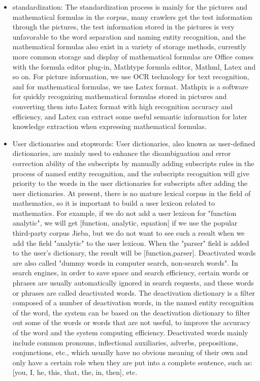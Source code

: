 \documentclass[11pt,en]{elegantpaper}
\begin{document}
\begin{itemize}
	\item standardization: The standardization process is mainly for the pictures and mathematical formulas in the corpus, many crawlers get the test information through the pictures, the test information stored in the pictures is very unfavorable to the word separation and naming entity recognition, and the mathematical formulas also exist in a variety of storage methods, currently more common storage and display of mathematical formulas are Office comes with the formula editor plug-in, Mathtype formula editor, Mathml, Latex and so on. For picture information, we use OCR technology for text recognition, and for mathematical formulas, we use Latex format. Mathpix is a software for quickly recognizing mathematical formulas stored in pictures and converting them into Latex format with high recognition accuracy and efficiency, and Latex can extract some useful semantic information for later knowledge extraction when expressing mathematical formulas.
	\item User dictionaries and stopwords: User dictionaries, also known as user-defined dictionaries, are mainly used to enhance the disambiguation and error correction ability of the subscripts by manually adding subscripts rules in the process of named entity recognition, and the subscripts recognition will give priority to the words in the user dictionaries for subscripts after adding the user dictionaries. At present, there is no mature lexical corpus in the field of mathematics, so it is important to build a user lexicon related to mathematics. For example, if we do not add a user lexicon for "function analytic", we will get [function, analytic, equation] if we use the popular third-party corpus Jieba, but we do not want to see such a result when we add the field "analytic" to the user lexicon. When the "parser" field is added to the user's dictionary, the result will be [function,parser]. Deactivated words are also called "dummy words in computer search, non-search words". In search engines, in order to save space and search efficiency, certain words or phrases are usually automatically ignored in search requests, and these words or phrases are called deactivated words. The deactivation dictionary is a filter composed of a number of deactivation words, in the named entity recognition of the word, the system can be based on the deactivation dictionary to filter out some of the words or words that are not useful, to improve the accuracy of the word and the system computing efficiency. Deactivated words mainly include common pronouns, inflectional auxiliaries, adverbs, prepositions, conjunctions, etc., which usually have no obvious meaning of their own and only have a certain role when they are put into a complete sentence, such as: [you, I, he, this, that, the, in, then], etc.

\end{itemize}
\end{document}
